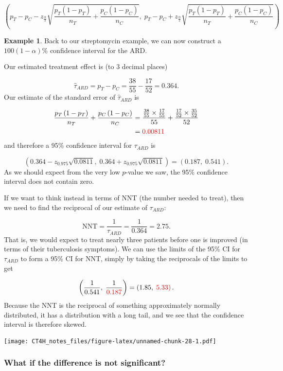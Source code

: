 \documentclass[
  openany]{book}
\theoremstyle{definition}
\theoremstyle{definition}
\newtheorem{example}{Example}[chapter]
\theoremstyle{definition}
\theoremstyle{definition}
\theoremstyle{remark}
\begin{document}
\[\left(p_T - p_C - z_{\frac{\alpha}{2}}\sqrt{\frac{p_T\left(1-p_T\right)}{n_T} + \frac{p_C\left(1-p_C\right)}{n_C}},\; p_T - p_C + z_{\frac{\alpha}{2}}\sqrt{\frac{p_T\left(1-p_T\right)}{n_T} + \frac{p_C\left(1-p_C\right)}{n_C}}\right) \]

\begin{example}
Back to our streptomycin example, we can now construct a \(100\left(1-\alpha\right)\)\% confidence interval for the ARD.

Our estimated treatment effect is (to 3 decimal places)

\[\hat\tau_{ARD}=p_T - p_C = \frac{38}{55} - \frac{17}{52} = 0.364.\]
Our estimate of the standard error of \(\hat\tau_{ARD}\) is

\[
\begin{aligned}
\frac{p_T\left(1-p_T\right)}{n_T} + \frac{p_C\left(1-p_C\right)}{n_C} & = \frac{\frac{38}{55}\times \frac{17}{55}}{55} + \frac{\frac{17}{52}\times \frac{35}{52}}{52}\\
& = \color{red}{0.00811}
\end{aligned}
\]
and therefore a 95\% confidence interval for \(\tau_{ARD}\) is

\[\left(0.364 - z_{0.975}\sqrt{0.0811},\; 0.364 + z_{0.975}\sqrt{0.0811}\right) = \left(0.187,\; 0.541\right). \]
As we should expect from the very low \(p\)-value we saw, the 95\% confidence interval does not contain zero.

If we want to think instead in terms of NNT (the number needed to treat), then we need to find the reciprocal of our estimate of \(\tau_{ARD}\):

\[ \text{NNT} = \frac{1}{\tau_{ARD}} = \frac{1}{0.364} = 2.75.\]
That is, we would expect to treat nearly three patients before one is improved (in terms of their tuberculosis symptoms). We can use the limits of the 95\% CI for \(\tau_{ARD}\) to form a 95\% CI for NNT, simply by taking the reciprocals of the limits to get

\[\left(\frac{1}{0.541},\; \frac{1}{\color{red}{0.187}}\right) = \left(1.85,\; \color{red}{5.33} \right).\]
Because the NNT is the reciprocal of something approximately normally distributed, it has a distribution with a long tail, and we see that the confidence interval is therefore skewed.

\texttt{[image: CT4H\_notes\_files/figure-latex/unnamed-chunk-28-1.pdf]}
\end{example}

\hypertarget{what-if-the-difference-is-not-significant}{%
\subsubsection{What if the difference is not significant?}\label{what-if-the-difference-is-not-significant}}
\end{document}
